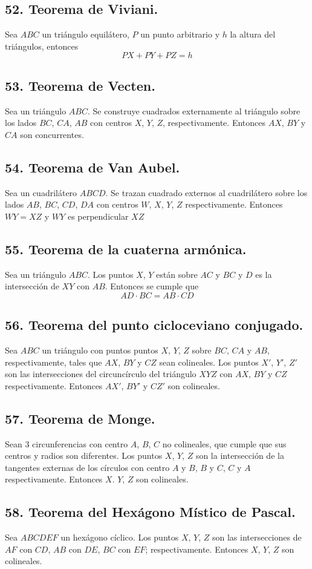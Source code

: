 \documentclass[12pt,a4paper]{article}
\begin{document}
\subsection*{52. Teorema de Viviani.}
Sea $ABC$ un triángulo equilátero, $P$ un punto arbitrario y $h$ la altura del triángulos, entonces $$PX + PY +PZ = h$$
\subsection*{53. Teorema de Vecten.}
Sea un triángulo $ABC$. Se construye cuadrados externamente al triángulo sobre los lados $BC$, $CA$, $AB$ con centros $X$, $Y$, $Z$, respectivamente. Entonces $AX$, $BY$ y $CA$ son concurrentes.
\subsection*{54. Teorema de Van Aubel.}
Sea un cuadrilátero $ABCD$. Se trazan cuadrado externos al cuadrilátero sobre los lados $AB$, $BC$, $CD$, $DA$ con centros $W$, $X$, $Y$, $Z$ respectivamente. Entonces $WY= XZ$ y $WY$ es perpendicular $XZ$
\subsection*{55. Teorema de la cuaterna armónica.}
Sea un triángulo $ABC$. Los puntos $X$, $Y$ están sobre ${AC}$ y ${BC}$ y $D$ es la intersección de $XY$ con $AB$. Entonces se cumple que $$AD \cdot BC= AB \cdot CD$$

\subsection*{56. Teorema del punto cicloceviano conjugado.}
Sea $ABC$ un triángulo con puntos puntos $X$, $Y$, $Z$ sobre ${BC}$, ${CA}$ y ${AB}$, respectivamente, tales que $AX$, $BY$ y $CZ$ sean colineales. Los puntos $X'$, $Y'$, $Z'$ son las intersecciones del circuncírculo del triángulo $XYZ$ con $AX$, $BY$ y $CZ$ respectivamente. Entonces $AX'$, $BY'$ y $CZ'$ son colineales.
\subsection*{57. Teorema de Monge.}
Sean 3 circunferencias con centro $A$, $B$, $C$ no colineales, que cumple que sus centros y radios son diferentes. Los puntos $X$, $Y$, $Z$ son la intersección de la tangentes externas de los círculos con centro $A$ y $B$, $B$ y $C$, $C$ y $A$ respectivamente. Entonces $X$. $Y$, $Z$ son colineales. 
\subsection*{58. Teorema del Hexágono Místico de Pascal.}
Sea $ABCDEF$ un hexágono cíclico. Los puntos $X$, $Y$, $Z$ son las intersecciones de $AF$ con $CD$, $AB$ con $DE$, $BC$ con $EF$; respectivamente. Entonces $X$, $Y$, $Z$ son colineales.
\end{document}
